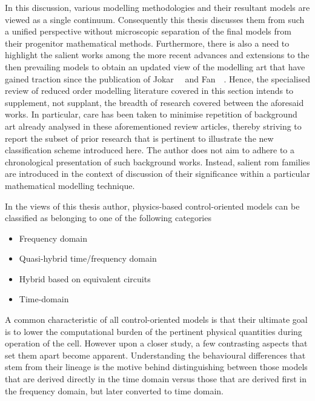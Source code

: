 In this discussion,  various modelling methodologies and  their resultant models
are viewed as  a single continuum. Consequently this thesis  discusses them from
such a  unified perspective without  microscopic separation of the  final models
from their progenitor mathematical methods. Furthermore, there is also a need to
highlight the salient works among the more recent advances and extensions to the
then  prevailing models  to obtain  an updated  view of  the modelling  art that
have  gained  traction  since the  publication  of  Jokar~\etal~\cite{Jokar2016}
and  Fan~\etal~\cite{Fan2015}. Hence,  the specialised  review of  reduced order
modelling  literature  covered  in  this  section  intends  to  supplement,  not
supplant,  the breadth  of  research  covered between  the  aforesaid works.  In
particular, care has been taken to minimise repetition of background art already
analysed in these aforementioned review articles, thereby striving to report the
subset of prior research that is  pertinent to illustrate the new classification
scheme introduced  here. The author  does not aim  to adhere to  a chronological
presentation of such  background works. Instead, salient  \gls{rom} families are
introduced  in  the  context  of  discussion  of  their  significance  within  a
particular mathematical modelling technique.


In the views of this thesis author, physics-based control-oriented models can be
classified as belonging to one of the following categories
\begin{itemize}
    \item Frequency domain 
    \item Quasi-hybrid time/frequency domain 
    \item Hybrid  based on equivalent circuits
    \item Time-domain 
\end{itemize}
A common characteristic of all control-oriented models is that their ultimate
goal is to lower the computational burden of the pertinent physical quantities
during operation of the cell.  However upon a closer study, a few contrasting
aspects that set them apart become apparent. Understanding the behavioural
differences that stem from their lineage is the motive behind distinguishing
between those models that are derived directly in the time  domain versus  those
that  are derived first  in the  frequency domain, but  later  converted  to
time  domain.

